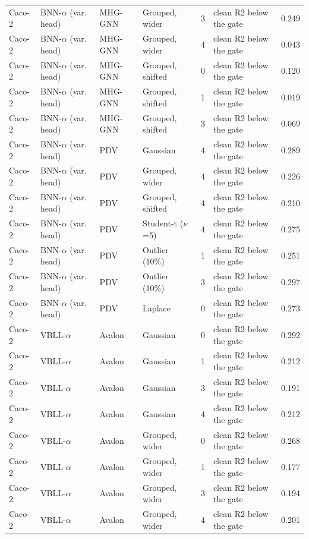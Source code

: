 {\begin{longtable}{llllcll}
Caco-2 & BNN-$\alpha$ (var. head) & MHG-GNN & Grouped, wider & 3 & clean R2 below the gate & 0.249 \\
Caco-2 & BNN-$\alpha$ (var. head) & MHG-GNN & Grouped, wider & 4 & clean R2 below the gate & 0.043 \\
Caco-2 & BNN-$\alpha$ (var. head) & MHG-GNN & Grouped, shifted & 0 & clean R2 below the gate & 0.120 \\
Caco-2 & BNN-$\alpha$ (var. head) & MHG-GNN & Grouped, shifted & 1 & clean R2 below the gate & 0.019 \\
Caco-2 & BNN-$\alpha$ (var. head) & MHG-GNN & Grouped, shifted & 3 & clean R2 below the gate & 0.069 \\
Caco-2 & BNN-$\alpha$ (var. head) & PDV & Gaussian & 4 & clean R2 below the gate & 0.289 \\
Caco-2 & BNN-$\alpha$ (var. head) & PDV & Grouped, wider & 4 & clean R2 below the gate & 0.226 \\
Caco-2 & BNN-$\alpha$ (var. head) & PDV & Grouped, shifted & 4 & clean R2 below the gate & 0.210 \\
Caco-2 & BNN-$\alpha$ (var. head) & PDV & Student-t ($\nu$=5) & 4 & clean R2 below the gate & 0.275 \\
Caco-2 & BNN-$\alpha$ (var. head) & PDV & Outlier (10\%) & 1 & clean R2 below the gate & 0.251 \\
Caco-2 & BNN-$\alpha$ (var. head) & PDV & Outlier (10\%) & 3 & clean R2 below the gate & 0.297 \\
Caco-2 & BNN-$\alpha$ (var. head) & PDV & Laplace & 0 & clean R2 below the gate & 0.273 \\
Caco-2 & VBLL-$\alpha$ & Avalon & Gaussian & 0 & clean R2 below the gate & 0.292 \\
Caco-2 & VBLL-$\alpha$ & Avalon & Gaussian & 1 & clean R2 below the gate & 0.212 \\
Caco-2 & VBLL-$\alpha$ & Avalon & Gaussian & 3 & clean R2 below the gate & 0.191 \\
Caco-2 & VBLL-$\alpha$ & Avalon & Gaussian & 4 & clean R2 below the gate & 0.212 \\
Caco-2 & VBLL-$\alpha$ & Avalon & Grouped, wider & 0 & clean R2 below the gate & 0.268 \\
Caco-2 & VBLL-$\alpha$ & Avalon & Grouped, wider & 1 & clean R2 below the gate & 0.177 \\
Caco-2 & VBLL-$\alpha$ & Avalon & Grouped, wider & 3 & clean R2 below the gate & 0.194 \\
Caco-2 & VBLL-$\alpha$ & Avalon & Grouped, wider & 4 & clean R2 below the gate & 0.201 \\

\end{longtable}}
